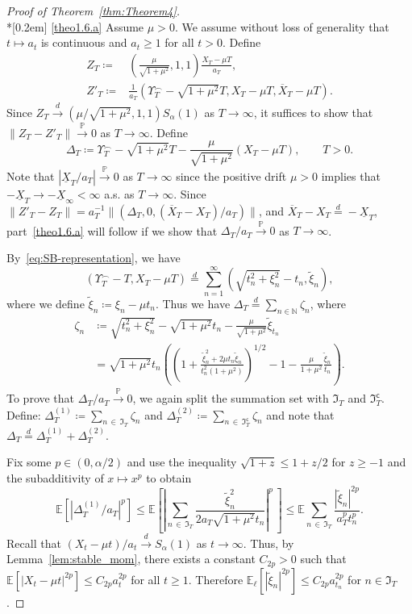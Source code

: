 \documentclass[AHL,Unicode,longabstracts,published]{cedram}
\newcommand\N{\mathbb{N}}
\newcommand\E{\mathds{E}}
\newcommand\p{\mathds{P}}
\newcommand\1{\mathds{1}}
\newcommand\GI{\mathfrak{I}}
\newcommand\co{\mathsf{c}}
\newcommand\eqd{\overset{d}{=}}
\newcommand\cid{\xrightarrow{d}}
\newcommand\cip{\xrightarrow{\p}}
\newcommand\ov[1]{\overline{#1}}
\newcommand\un[1]{\underline{#1}}
\newcommand\wt{\widetilde}
\begin{document}
\pagebreak

\begin{proof}[Proof of Theorem~\ref{thm:Theorem4}]
\ \\*[0.2em] 
\eqref{theo1.6.a} Assume $\mu >0$. We assume without loss of generality that $t\mapsto a_t$ is continuous and $a_t\ge 1$ for all $t>0$. Define
\begin{align*}
Z_T\coloneqq& \left(\frac{\mu}{\sqrt{1+\mu^2}},1,1\right)
\frac{X_T-\mu T}{a_T},
\\
 Z'_T\coloneqq& \frac{1}{a_T}
\left(\Upsilon_T^\frown -\sqrt{1+\mu^2}T,X_T-\mu T,\ov{X}_T-\mu T\right).
\end{align*}
Since $Z_T\cid(\mu/\sqrt{1+\mu^2},1,1)S_\alpha(1)$ as $T\to\infty$, it suffices to show that $\|Z_T-Z'_T\|\cip 0$ as $T \to \infty$. Define
\[
\Delta_T
\coloneqq \Upsilon_T^\frown -\sqrt{1+\mu^2}T -\frac{\mu}{\sqrt{1+\mu^2}}\left(X_T-\mu T\right),
\qquad T>0.
\]
Note that $|\un{X}_T/a_T|\cip 0$ as $T\to\infty$ since the positive drift $\mu >0$ implies that $-\un{X}_T\to-\un{X}_\infty<\infty$ a.s. as $T\to\infty$. Since $\|Z'_T-Z_T\| =a_T^{-1}\|(\Delta_T,0,(\ov{X}_T-X_T)/a_T)\|$, and $\ov{X}_T-X_T\eqd-\un{X}_T$, part~\eqref{theo1.6.a} will follow if we show that $\Delta_T/a_T\cip 0$ as $T\to\infty$.

By~\eqref{eq:SB-representation}, we have 
\[
\left(\Upsilon_T^\frown -T,X_T-\mu T\right)\eqd\sum_{n=1}^\infty\left(\sqrt{t_n^2+\xi_n^2}-t_n,\wt\xi_n\right),
\]
where we define $\wt\xi_n\coloneqq\xi_n-\mu t_n$. Thus we have $\Delta_T\eqd\sum_{n\in\N}\zeta_n$, where
\begin{align*}
\zeta_n &\coloneqq \sqrt{t_n^2+\xi_n^2} -\sqrt{1+\mu^2}t_n-\frac{\mu}{\sqrt{1+\mu^2}}\wt\xi_{t_n}\\
&=\sqrt{1+\mu^2}t_n
\left(\left(1+\frac{\wt\xi_n^2 + 2\mu t_n \wt\xi_n}{t_n^2\left(1+\mu^2\right)}\right)^{1/2}-1 -\frac{\mu}{1+\mu^2}\frac{\wt\xi_n}{t_n}\right).
\end{align*}
To prove that $\Delta_T/a_T\cip 0$, we again split the summation set with $\GI_T$ and $\GI_T^\co$. Define: $\Delta_T^{(1)}
\coloneqq \sum_{n\,\in\,\GI_T} \zeta_n$ and $\Delta_T^{(2)}
\coloneqq \sum_{n\,\in\,\GI_T^\co} \zeta_n$ and note that $\Delta_T\eqd\Delta_T^{(1)}+\Delta_T^{(2)}$.

Fix some $p\in(0,\alpha/2)$ and use the inequality $\sqrt{1+z}\le 1+z/2$ for $z\ge -1$ and the subadditivity of $x\mapsto x^p$ to obtain
\[
\E\left[\left|\Delta_T^{(1)}/a_T\right|^p\right]
\le\E\left[\left|\sum_{n\,\in\,\GI_T}
\frac{\wt\xi_n^2}{2a_T\sqrt{1+\mu^2}t_n}\right|^p\,
\right]
\le\E\sum_{n\,\in\,\GI_T}
\frac{\left|\wt\xi_n\right|^{2p}}{a_T^p t_n^p}.
\]
Recall that $(X_t-\mu t)/a_t\cid S_\alpha(1)$ as $t\to\infty$. Thus, by Lemma~\ref{lem:stable_mom}, there exists a constant $C_{2p}>0$ such that $\E[|X_t-\mu t|^{2p}]\leq C_{2p} a_t^{2p}$ for all $t\ge 1$. Therefore $\E_\ell[|\wt{\xi}_{n}|^{2p}]\le C_{2p} a_{t_n}^{2p}$ for $n\in\GI_T$.


\end{proof}
\end{document}
